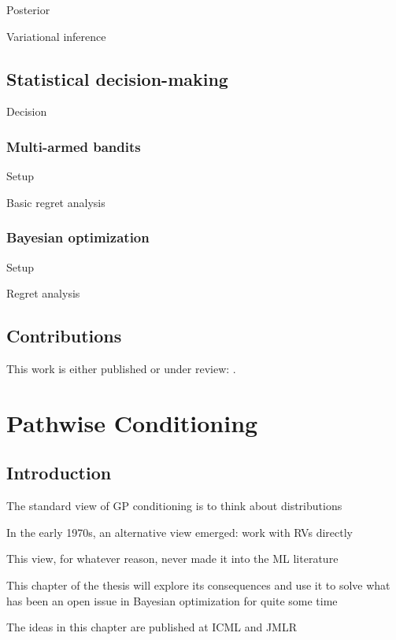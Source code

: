 \documentclass[11pt]{book}
\begin{document}
Posterior

Variational inference

\section{Statistical decision-making}

Decision

\subsection{Multi-armed bandits}

Setup

Basic regret analysis

\subsection{Bayesian optimization}

Setup

Regret analysis

\section{Contributions}

This work is either published or under review: \textcite{wilson20,borovitskiy20,borovitskiy21,wilson21,hutchinson21}.



\chapter{Pathwise Conditioning}
\label{ch:pathwise}

\section{Introduction}

The standard view of GP conditioning is to think about distributions

In the early 1970s, an alternative view emerged: work with RVs directly

This view, for whatever reason, never made it into the ML literature

This chapter of the thesis will explore its consequences and use it to solve what has been an open issue in Bayesian optimization for quite some time

The ideas in this chapter are published at ICML and JMLR
\end{document}
